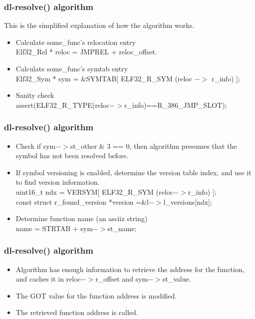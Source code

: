 \documentclass[10pt]{beamer}
\begin{document}
\begin{frame}[fragile]
\frametitle{dl-resolve() algorithm}

This is the simplified explanation of how the algorithm works.

 \begin{itemize}
    \item  Calculate some\_func's relocation entry
    \\
    Elf32\_Rel * reloc = JMPREL + reloc\_offset.

    \item Calculate some\_func's symtab entry
    \\
    Elf32\_Sym * sym = \&SYMTAB[ ELF32\_R\_SYM (reloc $->$ r\_info) ];

  	\item Sanity check
  	\\
  	assert(ELF32\_R\_TYPE(reloc$->$r\_info)==R\_386\_JMP\_SLOT);
  \end{itemize}

\end{frame}


\begin{frame}[fragile]
\frametitle{dl-resolve() algorithm}
 \begin{itemize}
    \item Check if sym$->$st\_other \& 3 == 0, then algorithm presumes that the symbol has not been resolved before.

    \item If symbol versioning is enabled, determine the version table index, and use it to find version information.
    \\
    uint16\_t ndx = VERSYM[ ELF32\_R\_SYM (reloc$->$r\_info) ];
    \\
    const struct r\_found\_version *version =\&l$->$l\_versions[ndx];

    \item Determine function name (an asciiz string)
    \\
    name = STRTAB + sym$->$st\_name;
  \end{itemize}

\end{frame}

\begin{frame}[fragile]
\frametitle{dl-resolve() algorithm}
 \begin{itemize}
    \item Algorithm has enough information to retrieve the address for the function, and caches it in reloc$->$r\_offset and sym$->$st\_value.

    \item The GOT value for the function address is modified.

    \item The retrieved function address is called.
  \end{itemize}

\end{frame}
\end{document}
